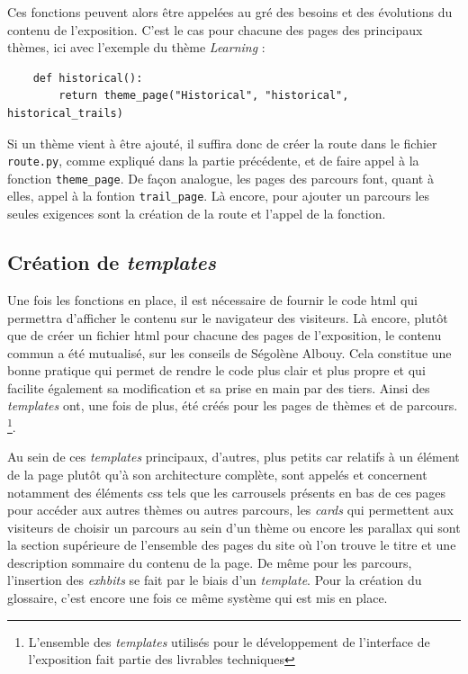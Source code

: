     Ces fonctions peuvent alors être appelées au gré des besoins et des évolutions du contenu de l'exposition. C'est le cas pour chacune des pages des principaux thèmes, ici avec l'exemple du thème \textit{Learning} :
    
    \begin{verbatim}
    def historical():
        return theme_page("Historical", "historical", historical_trails)
    \end{verbatim}
    
    Si un thème vient à être ajouté, il suffira donc de créer la route dans le fichier \texttt{route.py}, comme expliqué dans la partie précédente, et de faire appel à la fonction \texttt{theme\_page}. De façon analogue, les pages des parcours font, quant à elles, appel à la fontion \texttt{trail\_page}. Là encore, pour ajouter un parcours les seules exigences sont la création de la route et l'appel de la fonction. 
    
	\subsection{Création de \textit{templates}}
	Une fois les fonctions en place, il est nécessaire de fournir le code \acrshort{html} qui permettra d'afficher le contenu sur le navigateur des visiteurs. Là encore, plutôt que de créer un fichier \acrshort{html} pour chacune des pages de l'exposition, le contenu commun a été mutualisé, sur les conseils de Ségolène Albouy. Cela constitue une bonne pratique qui permet de rendre le code plus clair et plus propre et qui facilite également sa modification et sa prise en main par des tiers. Ainsi des \textit{templates} ont, une fois de plus, été créés pour les pages de thèmes et de parcours. \footnote{L'ensemble des \textit{templates} utilisés pour le développement de l'interface de l'exposition fait partie des livrables techniques}.
	
	Au sein de ces \textit{templates} principaux, d'autres, plus petits car relatifs à un élément de la page plutôt qu'à son architecture complète, sont appelés et concernent notamment des éléments \acrshort{css} tels que les carrousels présents en bas de ces pages pour accéder aux autres thèmes ou autres parcours, les \textit{cards} qui permettent aux visiteurs de choisir un parcours au sein d'un thème ou encore les parallax qui sont la section supérieure de l'ensemble des pages du site où l'on trouve le titre et une description sommaire du contenu de la page. 
	De même pour les parcours, l'insertion des \textit{exhbits} se fait par le biais d'un \textit{template}. Pour la création du glossaire, c'est encore une fois ce même système qui est mis en place. 
	
